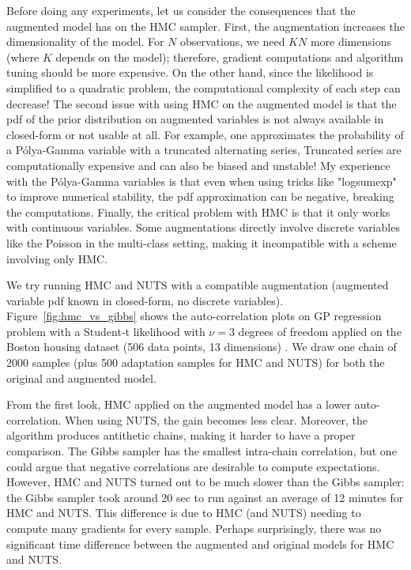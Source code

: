 Before doing any experiments, let us consider the consequences that the augmented model has on the \ac{HMC} sampler.
First, the augmentation increases the dimensionality of the model.
For $N$ observations, we need $KN$ more dimensions (where $K$ depends on the model); therefore, gradient computations and algorithm tuning should be more expensive.
On the other hand, since the likelihood is simplified to a quadratic problem, the computational complexity of each step can decrease!
The second issue with using \ac{HMC} on the augmented model is that the \ac{pdf} of the prior distribution on augmented variables is not always available in closed-form or not usable at all.
For example, one approximates the probability of a P\'olya-Gamma variable with a truncated alternating series,
Truncated series are computationally expensive and can also be biased and unstable!
My experience with the P\'olya-Gamma variables is that even when using tricks like "logsumexp" to improve numerical stability, the \ac{pdf} approximation can be negative, breaking the computations.
Finally, the critical problem with \ac{HMC} is that it only works with continuous variables.
Some augmentations directly involve discrete variables like the Poisson in the multi-class setting, making it incompatible with a scheme involving only \ac{HMC}.

We try running \ac{HMC} and \ac{NUTS} with a compatible augmentation (augmented variable \ac{pdf} known in closed-form, no discrete variables).
Figure~\ref{fig:hmc_vs_gibbs} shows the auto-correlation plots on \ac{GP} regression problem with a Student-t likelihood with $\nu=3$ degrees of freedom applied on the Boston housing dataset (506 data points, 13 dimensions) \cite{harrison1978hedonic}.
We draw one chain of 2000 samples (plus 500 adaptation samples for \ac{HMC} and \ac{NUTS}) for both the original and augmented model.

From the first look, \ac{HMC} applied on the augmented model has a lower auto-correlation.
When using \ac{NUTS}, the gain becomes less clear.
Moreover, the algorithm produces antithetic chains, making it harder to have a proper comparison.
The Gibbs sampler has the smallest intra-chain correlation, but one could argue that negative correlations are desirable to compute expectations.
However, \ac{HMC} and \ac{NUTS} turned out to be much slower than the Gibbs sampler:
the Gibbs sampler took around 20 sec to run against an average of 12 minutes for \ac{HMC} and \ac{NUTS}.
This difference is due to \ac{HMC} (and \ac{NUTS}) needing to compute many gradients for every sample.  
Perhaps surprisingly, there was no significant time difference between the augmented and original models for \ac{HMC} and \ac{NUTS}.


